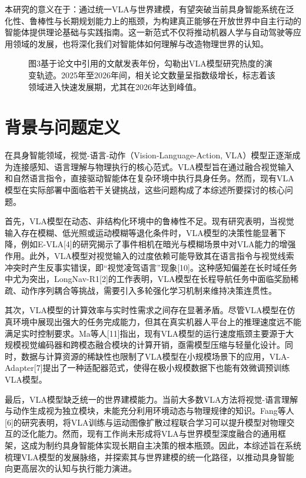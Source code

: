 \documentclass{article}
\begin{document}
本研究的意义在于：通过统一VLA与世界建模，有望突破当前具身智能系统在泛化性、鲁棒性与长期规划能力上的瓶颈，为构建真正能够在开放世界中自主行动的智能体提供理论基础与实践指南。这一新范式不仅将推动机器人学与自动驾驶等应用领域的发展，也将深化我们对智能体如何理解与改造物理世界的认知。

\begin{figure}[h]
\centering
\caption{图3基于论文中引用的文献发表年份，勾勒出VLA模型研究热度的演变轨迹。2025年至2026年间，相关论文数量呈指数级增长，标志着该领域进入快速发展期，尤其在2026年达到峰值。}
\label{fig:1}
\end{figure}

\section{背景与问题定义}

在具身智能领域，视觉-语言-动作（Vision-Language-Action, VLA）模型正逐渐成为连接感知、语言理解与物理执行的核心范式。VLA模型旨在通过融合视觉输入和自然语言指令，直接驱动智能体在复杂环境中执行具身任务。然而，现有VLA模型在实际部署中面临若干关键挑战，这些问题构成了本综述所要探讨的核心问题。

首先，VLA模型在动态、非结构化环境中的鲁棒性不足。现有研究表明，当视觉输入存在模糊、低光照或运动模糊等退化条件时，VLA模型的决策性能显著下降，例如E-VLA[4]的研究揭示了事件相机在暗光与模糊场景中对VLA能力的增强作用。此外，VLA模型对视觉输入的过度依赖可能导致其在语言指令与视觉线索冲突时产生反事实错误，即“视觉凌驾语言”现象[10]。这种感知偏差在长时域任务中尤为突出，LongNav-R1[2]的工作表明，VLA模型在长程导航任务中面临奖励稀疏、动作序列耦合等挑战，需要引入多轮强化学习机制来维持决策连贯性。

其次，VLA模型的计算效率与实时性需求之间存在显著矛盾。尽管VLA模型在仿真环境中展现出强大的任务完成能力，但其在真实机器人平台上的推理速度远不能满足实时控制要求。Ma等人[11]指出，现有VLA模型的运行速度瓶颈主要源于大规模视觉编码器和跨模态融合模块的计算开销，亟需模型压缩与轻量化设计。同时，数据与计算资源的稀缺性也限制了VLA模型在小规模场景下的应用，VLA-Adapter[7]提出了一种适配器范式，使得在极小规模数据下也能有效微调预训练VLA模型。

最后，VLA模型缺乏统一的世界建模能力。当前大多数VLA方法将视觉-语言理解与动作生成视为独立模块，未能充分利用环境动态与物理规律的知识。Fang等人[6]的研究表明，将VLA训练与运动图像扩散过程联合学习可以提升模型对物理交互的泛化能力。然而，现有工作尚未形成将VLA与世界模型深度融合的通用框架，这成为制约具身智能体实现长期自主决策的根本瓶颈。因此，本综述旨在系统梳理VLA模型的发展脉络，并探索其与世界建模的统一化路径，以推动具身智能向更高层次的认知与执行能力演进。
\end{document}
